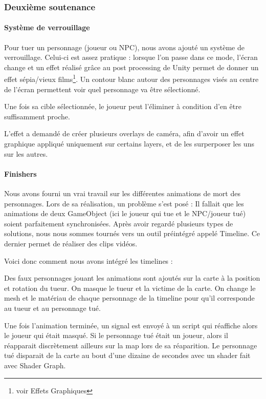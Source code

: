 	\vspace{0.5cm}
	\subsubsection{Deuxième soutenance}
	\vspace{0.5cm}

		\paragraph{Système de verrouillage}

			Pour tuer un personnage (joueur ou NPC),
			nous avons ajouté un système de verrouillage. Celui-ci est assez pratique : lorsque l'on passe dans ce mode, l'écran change et 
			un effet réalisé grâce au post processing de Unity permet de donner un effet sépia/vieux films\footnote{voir Effets Graphiques}.
			Un contour blanc autour des personnages visés au centre de l'écran permettent voir quel personnage va être sélectionné.

			Une fois sa cible sélectionnée, le joueur peut l'éliminer à condition d'en être suffisamment proche.

			L'effet a demandé de créer plusieurs overlays de caméra, afin d'avoir un effet graphique
			appliqué uniquement sur certains layers, et de les surperposer les uns sur les autres. 

		\paragraph{Finishers}
			Nous avons fourni un vrai travail sur les différentes animations de mort des personnages.
			Lors de sa réalisation, un problème s'est posé : Il fallait que les animations de deux GameObject (ici le joueur qui tue et le NPC/joueur tué) 
			soient parfaitement synchronisées. Après avoir regardé plusieurs types de solutions, nous nous sommes tournés vers un outil préintégré appelé Timeline.
			Ce dernier permet de réaliser des clips vidéos.

			Voici donc comment nous avons intégré les timelines :
			
			Des faux personnages jouant les animations sont ajoutés sur la carte à la position et rotation du tueur.
			On masque le tueur et la victime de la carte.
			On change le mesh et le matériau de chaque personnage de la timeline pour qu'il corresponde au tueur et au
			personnage tué.

			Une fois l'animation terminée, un signal est envoyé à un script qui réaffiche alors le joueur qui était masqué.
			Si le personnage tué était un joueur, alors il réapparait discrètement ailleurs sur la map lors de sa réaparition.
			Le personnage tué disparait de la carte au bout d'une dizaine de secondes avec un shader fait avec Shader Graph.

